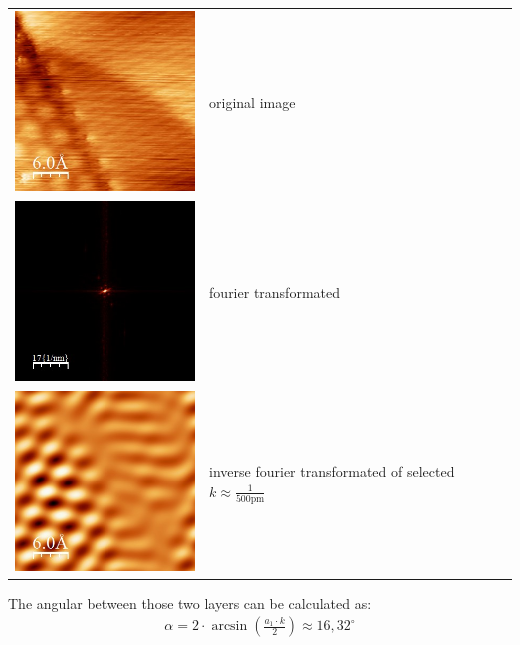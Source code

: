 \documentclass[a4paper, parskip=half]{scrartcl}
\begin{document}
\begin{center}
\begin{tabular}{>{\centering\arraybackslash}m{2in} >{\centering\arraybackslash}m{2in}}
\includegraphics[width=5cm]{img/moire_0} & original image \\
\includegraphics[width=5cm]{img/moire_fft} & fourier transformated \\
\includegraphics[width=5cm]{img/moire_1} & inverse fourier transformated of selected $k \approx \frac{1}{500 \text{pm}}$
\end{tabular}
\end{center}
The angular between those two layers can be calculated as:
\begin{align}
\alpha = 2 \cdot \arcsin\left( \frac{a_1 \cdot k}{2} \right) \approx 16,32^\circ
\end{align}
\end{document}
